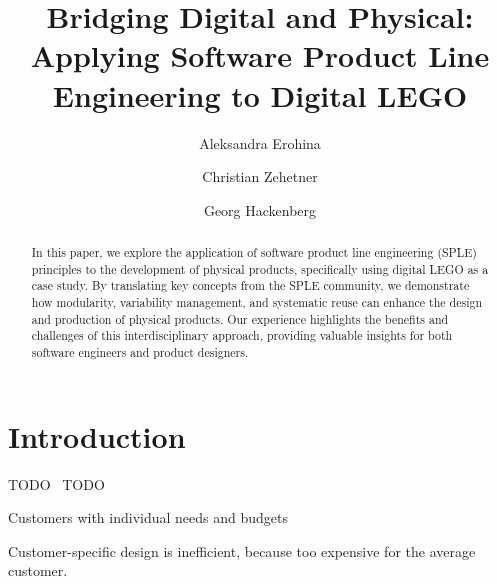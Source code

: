 \documentclass[sigconf,review]{acmart}
\begin{document}
\title{Bridging Digital and Physical: Applying Software Product Line Engineering to Digital LEGO}

\author{Aleksandra Erohina}

\author{Christian Zehetner}

\author{Georg Hackenberg}

\begin{abstract}
    In this paper, we explore the application of software product line engineering (SPLE) principles to the development of physical products, specifically using digital LEGO as a case study. 
    By translating key concepts from the SPLE community, we demonstrate how modularity, variability management, and systematic reuse can enhance the design and production of physical products. 
    Our experience highlights the benefits and challenges of this interdisciplinary approach, providing valuable insights for both software engineers and product designers.
\end{abstract}


\maketitle

\section{Introduction}
\label{sec:introduction}

TODO~\cite{Hackenberg_2023} TODO~\cite{Baldwin_1997}

Customers with individual needs and budgets

Customer-specific design is inefficient, because too expensive for the average customer.
\end{document}
